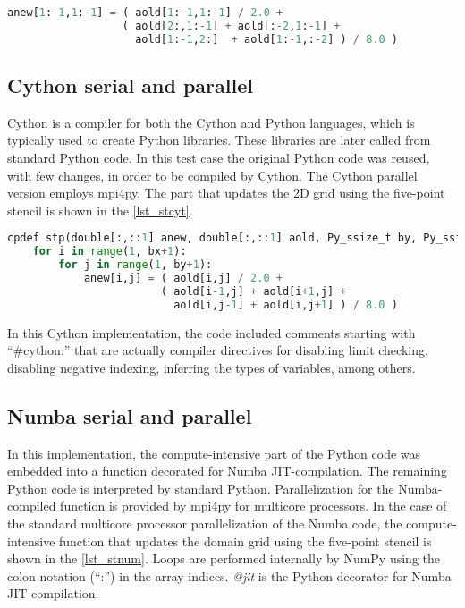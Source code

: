 \begin{lstlisting}[float=hbt, language=Python, label={lst_sfpyt}, caption={Compute-intensive part of the Python implementation.}]
anew[1:-1,1:-1] = ( aold[1:-1,1:-1] / 2.0 +
                  ( aold[2:,1:-1] + aold[:-2,1:-1] +
                    aold[1:-1,2:]  + aold[1:-1,:-2] ) / 8.0 )
\end{lstlisting}

%
%
%
\subsection{Cython serial and parallel} %
\label{sec_stenimplcy}

Cython is a compiler for both the Cython and Python languages, which is typically used to create Python libraries. These libraries are later called from standard Python code. In this test case the original Python code was reused, with few changes, in order to be compiled by Cython. The Cython parallel version employs mpi4py. The part that updates the 2D grid using the five-point stencil is shown in the \autoref {lst_stcyt}.

\begin{lstlisting}[float=hbt, language=Python, label=lst_stcyt, caption={Compute-intensive part of the Cython implementation.}]
cpdef stp(double[:,::1] anew, double[:,::1] aold, Py_ssize_t by, Py_ssize_t bx):
    for i in range(1, bx+1):
        for j in range(1, by+1):
            anew[i,j] = ( aold[i,j] / 2.0 +
                        ( aold[i-1,j] + aold[i+1,j] +
                          aold[i,j-1] + aold[i,j+1] ) / 8.0 )
\end{lstlisting}

In this Cython implementation, the code included comments starting with ``\#cython:'' that are actually compiler directives for disabling limit checking, disabling negative indexing, inferring the types of variables, among others.

%
%
%
\subsection{Numba serial and parallel} %
\label{sec_stenimplnumb}

In this implementation, the compute-intensive part of the Python code was embedded into a function decorated for Numba JIT-compilation. The remaining Python code is interpreted by standard Python. Parallelization for the Numba-compiled function is provided by mpi4py for multicore processors. In the case of the standard multicore processor parallelization of the Numba code, the compute-intensive function that updates the domain grid using the five-point stencil is shown in the \autoref {lst_stnum}. Loops are performed internally by NumPy using the colon notation (``:'') in the array indices. \textit {@jit} is the Python decorator for Numba JIT compilation.

